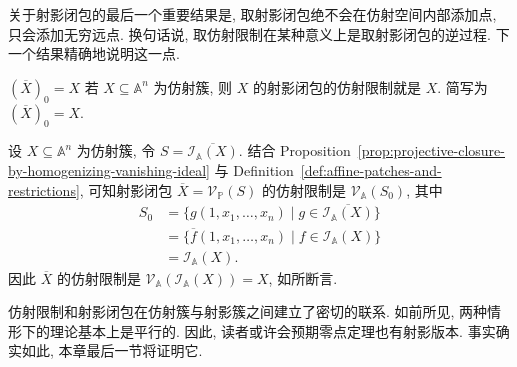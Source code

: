 关于射影闭包的最后一个重要结果是, 取射影闭包绝不会在仿射空间内部添加点, 只会添加无穷远点. 换句话说, 取仿射限制在某种意义上是取射影闭包的逆过程. 下一个结果精确地说明这一点.

\begin{Proposition}{$(\overline{X})_{0}=X$}\leavevmode\label{prop:affine-restriction-of-projective-closure}
若 $X\subseteq\mathbb{A}^{n}$ 为仿射簇, 则 $X$ 的射影闭包的仿射限制就是 $X$. 简写为 $(\overline{X})_{0}=X$.
\end{Proposition}
\begin{Proof}
设 $X\subseteq\mathbb{A}^{n}$ 为仿射簇, 令 $S=\overline{\mathcal{I}_{\mathbb{A}}(X)}$. 结合 Proposition~\ref{prop:projective-closure-by-homogenizing-vanishing-ideal} 与 Definition~\ref{def:affine-patches-and-restrictions}, 可知射影闭包 $\overline{X}=\mathcal{V}_{\mathbb{P}}(S)$ 的仿射限制是 $\mathcal{V}_{\mathbb{A}}(S_{0})$, 其中
\[
  \begin{aligned}
    S_{0}&=\{g(1,x_{1},\ldots,x_{n})\mid g\in\overline{\mathcal{I}_{\mathbb{A}}(X)}\}\\
         &=\{\overline{f}(1,x_{1},\ldots,x_{n})\mid f\in\mathcal{I}_{\mathbb{A}}(X)\}\\
         &=\mathcal{I}_{\mathbb{A}}(X).
  \end{aligned}
\]
因此 $\overline{X}$ 的仿射限制是 $\mathcal{V}_{\mathbb{A}}(\mathcal{I}_{\mathbb{A}}(X))=X$, 如所断言.
\end{Proof}

仿射限制和射影闭包在仿射簇与射影簇之间建立了密切的联系. 如前所见, 两种情形下的理论基本上是平行的. 因此, 读者或许会预期零点定理也有射影版本. 事实确实如此, 本章最后一节将证明它.

